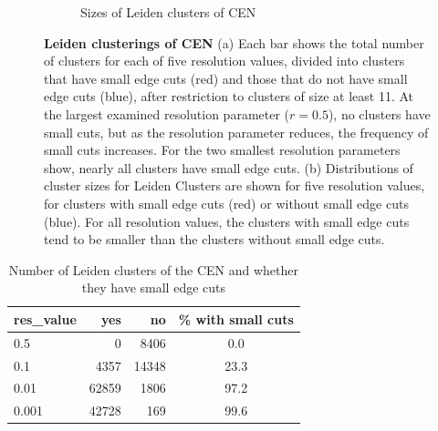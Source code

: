 \documentclass[11pt]{article}   	%
\begin{document}
\begin{figure}[H]
\begin{subfigure}[t]{0.45\textwidth}
\begin{center}
\caption{Sizes of Leiden clusters of CEN}
\end{center}
\label{fig:cenistouched-part2}
\end{subfigure}
\caption{\textbf {Leiden clusterings of CEN} (a)
Each bar shows the total number of clusters for each of five resolution values, divided into clusters that have small edge cuts (red)  and those that do not have small edge cuts (blue), after restriction  to clusters of size at least 11. At the largest examined resolution parameter ($r=0.5$), no clusters have small cuts, but  as the resolution parameter reduces, the frequency of  small cuts increases.
For the two smallest resolution parameters show, nearly all clusters have small edge cuts.
(b)  Distributions of cluster sizes  for Leiden Clusters are shown for five resolution values, for clusters with small edge cuts (red) or without small edge cuts (blue). For all resolution values, the clusters with small edge cuts tend to be smaller than the clusters without small edge cuts.}
\label{fig:cenistouched-leiden}
\end{figure}



\begin{table}[ht]
\centering
\begin{tabular}{lrrc}
  \hline
res\_value  & yes & no & \% with small cuts\\
  \hline
  0.5 & 0  & 8406  & 0.0\\
  0.1 & 4357 & 14348 & 23.3\\
    0.01 & 62859 & 1806 & 97.2\\
  0.001 & 42728 & 169 & 99.6 \\
   \hline
\end{tabular}
\caption{Number of Leiden clusters of the CEN and whether they have small edge cuts}
\label{tab:Leiden-CEN-num-smallcut}
\end{table}
\end{document}
